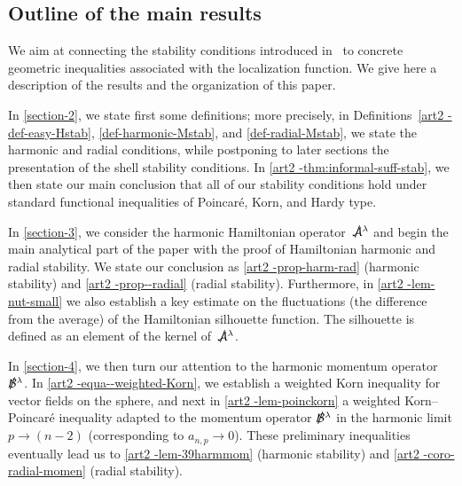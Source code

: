 \documentclass[11pt]{article}
\numberwithin{table}{section}
\numberwithin{equation}{section}
\numberwithin{table}{section}
\numberwithin{figure}{section}
\begin{document}

\subsection{Outline of the main results}
\label{sectionN1-3}

We aim at connecting the stability conditions introduced in~\cite{LL-optimal-main} to concrete geometric inequalities associated with the localization function. We give here a description of the results and the organization of this paper.  

\bei

\item In \autoref{section-2}, we state first some definitions; more precisely, in Definitions~\ref{art2 -def-easy-Hstab}, \ref{def-harmonic-Mstab}, and \ref{def-radial-Mstab}, 
we state the harmonic and radial conditions, while postponing to later sections the presentation of the shell stability conditions. In \autoref{art2 -thm:informal-suff-stab}, we then state our main conclusion that all of our stability conditions hold under standard functional inequalities of Poincar\'e, Korn, and Hardy type.  

\item In \autoref{section-3}, we consider the harmonic Hamiltonian operator~$\ssA^\lambda$ and begin the main analytical part of the paper with the proof of Hamiltonian harmonic and radial stability. We state our conclusion as \autoref{art2 -prop-harm-rad} (harmonic stability) and \autoref{art2 -prop--radial} (radial stability). Furthermore, in \autoref{art2 -lem-nut-small} we also establish a key estimate on the fluctuations (the difference from the average) of the Hamiltonian silhouette function. The silhouette is defined as an element of the kernel of~$\ssA^\lambda$.

\item In \autoref{section-4}, we then turn our attention to the harmonic momentum operator~$\ssB^{\lambda}$. In \autoref{art2 -equa--weighted-Korn}, we establish a weighted Korn inequality for vector fields on the sphere, and next in \autoref{art2 -lem-poinckorn} a weighted Korn--Poincar\'e inequality adapted to the momentum operator $\ssB^{\lambda}$ in the harmonic limit $p \to (n- 2)$ (corresponding to $a_{n,p}\to 0$). These preliminary inequalities eventually lead us to \autoref{art2 -lem-39harmmom} (harmonic stability) and \autoref{art2 -coro-radial-momen} (radial stability).
\end{document}
